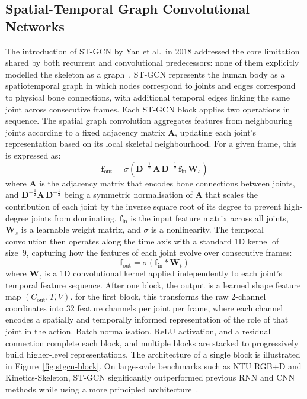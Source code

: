 \subsection{Spatial-Temporal Graph Convolutional Networks}
The introduction of ST-GCN by Yan et al.\ in 2018 addressed the core limitation shared by both recurrent and convolutional predecessors: none of them explicitly modelled the skeleton as a graph~\cite{yan2018stgcn}. ST-GCN represents the human body as a spatiotemporal graph in which nodes correspond to joints and edges correspond to physical bone connections, with additional temporal edges linking the same joint across consecutive frames. Each ST-GCN block applies two operations in sequence. The spatial graph convolution aggregates features from neighbouring joints according to a fixed adjacency matrix $\mathbf{A}$, updating each joint's representation based on its local skeletal neighbourhood. For a given frame, this is expressed as:
%
\begin{equation}
    \mathbf{f}_{\text{out}} = \sigma\!\left(\mathbf{D}^{-\frac{1}{2}}\,\mathbf{A}\,\mathbf{D}^{-\frac{1}{2}}\,\mathbf{f}_{\text{in}}\,\mathbf{W}_s\right)
    \label{eq:spatial-conv}
\end{equation}
%
where $\mathbf{A}$ is the adjacency matrix that encodes bone connections between joints, and $\mathbf{D}^{-\frac{1}{2}}\mathbf{A}\,\mathbf{D}^{-\frac{1}{2}}$ being a symmetric normalisation of $\mathbf{A}$ that scales the contribution of each joint by the inverse square root of its degree to prevent high-degree joints from dominating. $\mathbf{f}_{\text{in}}$ is the input feature matrix across all joints, $\mathbf{W}_s$ is a learnable weight matrix, and $\sigma$ is a nonlinearity. The temporal convolution then operates along the time axis with a standard 1D kernel of size~9, capturing how the features of each joint evolve over consecutive frames:
%
\begin{equation}
    \mathbf{f}_{\text{out}} = \sigma\!\left(\mathbf{f}_{\text{in}} * \mathbf{W}_t\right)
    \label{eq:temporal-conv}
\end{equation}
%
where $\mathbf{W}_t$ is a 1D convolutional kernel applied independently to each joint's temporal feature sequence. After one block, the output is a learned shape feature map $(C_{\text{out}}, T, V)$. for the first block, this transforms the raw 2-channel coordinates into 32 feature channels per joint per frame, where each channel encodes a spatially and temporally informed representation of the role of that joint in the action. Batch normalisation, ReLU activation, and a residual connection complete each block, and multiple blocks are stacked to progressively build higher-level representations. The architecture of a single block is illustrated in Figure~\ref{fig:stgcn-block}. On large-scale benchmarks such as NTU RGB+D and Kinetics-Skeleton, ST-GCN significantly outperformed previous RNN and CNN methods while using a more principled architecture~\cite{yan2018stgcn}.

